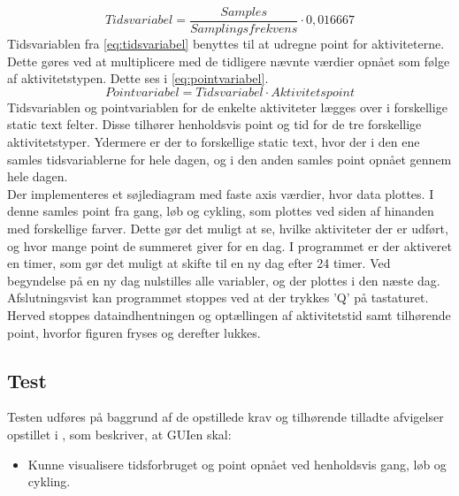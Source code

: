 \begin{equation}
Tidsvariabel = \frac{Samples}{Samplingsfrekvens} \cdot 0,016667
\label{eq:tidsvariabel}
\end{equation}
Tidsvariablen fra \eqref{eq:tidsvariabel} benyttes til at udregne point for aktiviteterne. Dette gøres ved at multiplicere med de tidligere nævnte værdier opnået som følge af aktivitetstypen. Dette ses i \eqref{eq:pointvariabel}. 
\begin{equation}
Pointvariabel = Tidsvariabel \cdot Aktivitetspoint
\label{eq:pointvariabel}
\end{equation}
Tidsvariablen og pointvariablen for de enkelte aktiviteter lægges over i forskellige static text felter. Disse tilhører henholdsvis point og tid for de tre forskellige aktivitetstyper. Ydermere er der to forskellige static text, hvor der i den ene samles tidsvariablerne for hele dagen, og i den anden samles point opnået gennem hele dagen. \\
Der implementeres et søjlediagram med faste axis værdier, hvor data plottes. I denne samles point fra gang, løb og cykling, som plottes ved siden af hinanden med forskellige farver. Dette gør det muligt at se, hvilke aktiviteter der er udført, og hvor mange point de summeret giver for en dag. I programmet er der aktiveret en timer, som gør det muligt at skifte til en ny dag efter 24 timer. Ved begyndelse på en ny dag nulstilles alle variabler, og der plottes i den næste dag.\\ 
Afslutningsvist kan programmet stoppes ved at der trykkes 'Q' på tastaturet. Herved stoppes dataindhentningen og optællingen af aktivitetstid samt tilhørende point, hvorfor figuren fryses og derefter lukkes. 

\subsection{Test}
Testen udføres på baggrund af de opstillede krav og tilhørende tilladte afvigelser opstillet i , som beskriver, at GUIen skal:
\begin{itemize}
	\item Kunne visualisere tidsforbruget og point opnået ved henholdsvis gang, løb og cykling.  
\end{itemize}

